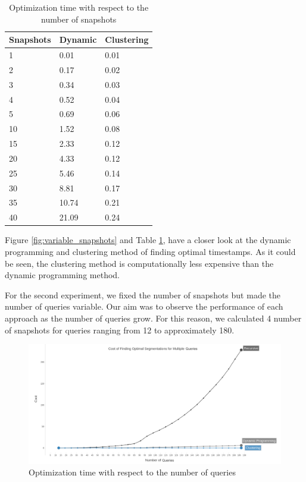 			\begin{center}
			\begin{table}
				\centering
				\caption{Optimization time with respect to the number of snapshots}
				\label {table:variable_snapshots_2}
				\begin{tabular}{p{2cm}p{3cm}p{3cm}}
					\hline
					Snapshots  & Dynamic  & Clustering \\ \hline
					1 &   0.01 & 0.01 \\  
					2 &  0.17  & 0.02  \\
					3 &  0.34  & 0.03  \\
					4 & 0.52  & 0.04  \\
					5 &  0.69  & 0.06 \\
					10 &  1.52  & 0.08  \\
					15 & 2.33  & 0.12  \\ 
					20 & 4.33  & 0.12  \\ 
					25 & 5.46  & 0.14  \\ 
					30 & 8.81  & 0.17  \\
					35 & 10.74  & 0.21  \\
					40 & 21.09  & 0.24  \\\hline
				\end{tabular}
			\end{table}
			\end{center}
			Figure \ref{fig:variable_snapshots} and Table \ref{table:variable_snapshots_2}, have a closer look at the dynamic programming and clustering method of finding optimal timestamps. As it could be seen, the clustering method is computationally less expensive than the dynamic programming method.

			For the second experiment, we fixed the number of snapshots but made the number of queries variable. Our aim was to observe the performance of each approach as the number of queries grow. For this reason, we calculated 4 number of snapshots for queries ranging from 12 to approximately 180. 

			\begin{figure}
				\centering
				\includegraphics[width=\textwidth]{figs/multi_query.jpg}
				\caption{Optimization time with respect to the number of queries}
				\label{fig:variable_queries}
			\end{figure} 


